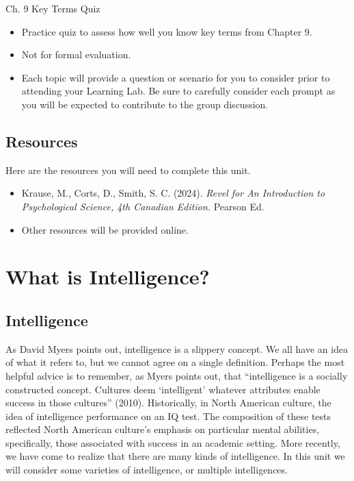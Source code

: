 \documentclass[
]{book}
\providecommand{\tightlist}{%
  \setlength{\itemsep}{0pt}\setlength{\parskip}{0pt}}
\begin{document}
\begin{reflect}
{Ch. 9 Key Terms Quiz}

\begin{itemize}
\tightlist
\item
  Practice quiz to assess how well you know key terms from Chapter 9.\\
\item
  Not for formal evaluation.\\
\item
  Each topic will provide a question or scenario for you to consider prior to attending your Learning Lab. Be sure to carefully consider each prompt as you will be expected to contribute to the group discussion.
\end{itemize}
\end{reflect}

\hypertarget{resources-1}{%
\subsection*{Resources}\label{resources-1}}

Here are the resources you will need to complete this unit.

\begin{itemize}
\tightlist
\item
  Krause, M., Corts, D., Smith, S. C. (2024). \emph{Revel for An Introduction to Psychological Science, 4th Canadian Edition.} Pearson Ed.\\
\item
  Other resources will be provided online.
\end{itemize}

\hypertarget{what-is-intelligence}{%
\section{What is Intelligence?}\label{what-is-intelligence}}

\hypertarget{intelligence}{%
\subsection*{Intelligence}\label{intelligence}}

As David Myers points out, intelligence is a slippery concept. We all have an idea of what it refers to, but we cannot agree on a single definition. Perhaps the most helpful advice is to remember, as Myers points out, that ``intelligence is a socially constructed concept. Cultures deem `intelligent' whatever attributes enable success in those cultures'' (2010). Historically, in North American culture, the idea of intelligence performance on an IQ test. The composition of these tests reflected North American culture's emphasis on particular mental abilities, specifically, those associated with success in an academic setting. More recently, we have come to realize that there are many kinds of intelligence. In this unit we will consider some varieties of intelligence, or multiple intelligences.
\end{document}

